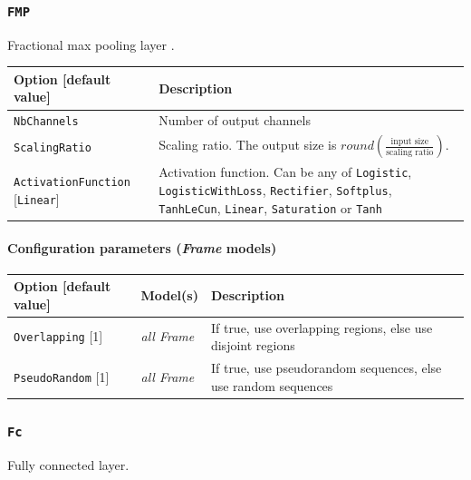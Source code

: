 \documentclass[a4paper,11pt,oneside]{article}
\begin{document}
\subsubsection{\texorpdfstring{%
\lstinline[basicstyle=\ttfamily\bfseries]!FMP!}{FMP}}
Fractional max pooling layer \citep{Graham2014}.

\begin{center}
 \begin{longtable}{| p{5cm} | p{10cm} | }
 \hline
 Option [default value] & Description\\
 \hline\hline
  \cellcolor{requiredcolor}\lstinline!NbChannels! & Number of output channels \\
  \cellcolor{requiredcolor}\lstinline!ScalingRatio! & Scaling ratio.
  The output size is $round\left(\frac{\text{input size}}
  {\text{scaling ratio}}\right)$. \\
  \lstinline!ActivationFunction! [\lstinline!Linear!] & Activation function.
  Can be any of \lstinline!Logistic!,  \lstinline!LogisticWithLoss!,
  \lstinline!Rectifier!, \lstinline!Softplus!, \lstinline!TanhLeCun!,
  \lstinline!Linear!, \lstinline!Saturation! or \lstinline!Tanh! \\
 \hline
\end{longtable}
\end{center}

\paragraph{Configuration parameters (\emph{Frame} models)}

\begin{center}
 \begin{longtable}{| p{4cm} | p{3cm} | p{9cm} | }
 \hline
 Option [default value] & Model(s) & Description\\
 \hline\hline
  \lstinline!Overlapping! [1] & \emph{all Frame} & If true, use overlapping
  regions, else use disjoint regions \\
  \lstinline!PseudoRandom! [1] & \emph{all Frame} & If true, use pseudorandom
  sequences, else use random sequences \\
 \hline
\end{longtable}
\end{center}


\subsubsection{\texorpdfstring{%
\lstinline[basicstyle=\ttfamily\bfseries]!Fc!}{Fc}}
Fully connected layer.
\end{document}
